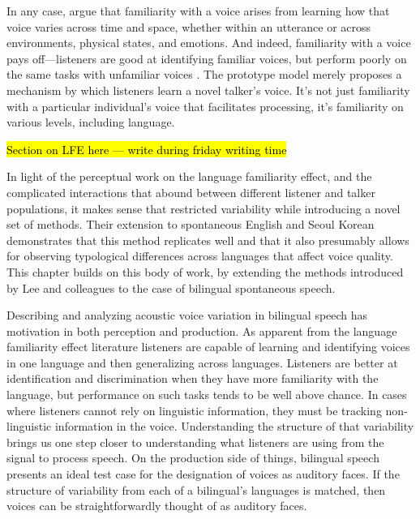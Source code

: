 In any case, \citet{lee_2019_acoustic} argue that familiarity with a voice arises from learning how that voice varies across time and space, whether within an utterance or across environments, physical states, and emotions. And indeed, familiarity with a voice pays off---listeners are good at identifying familiar voices, but perform poorly on the same tasks with unfamiliar voices \citep{nygaard_1998_talker}. The prototype model merely proposes a mechanism by which listeners learn a novel talker's voice. It's not just familiarity with a particular individual's voice that facilitates processing, it's familiarity on various levels, including language. 

\hl{Section on LFE here --- write during friday writing time}


In light of the perceptual work on the language familiarity effect, and the complicated interactions that abound between different listener and talker populations, it makes sense that \citet{lee_2019_acoustic} restricted variability while introducing a novel set of methods. Their extension to spontaneous English and Seoul Korean demonstrates that this method replicates well and that it also presumably allows for observing typological differences across languages that affect voice quality. This chapter builds on this body of work, by extending the methods introduced by Lee and colleagues to the case of bilingual spontaneous speech. 

Describing and analyzing acoustic voice variation in bilingual speech has motivation in both perception and production. As apparent from the language familiarity effect literature listeners are capable of learning and identifying voices in one language and then generalizing across languages. Listeners are better at identification and discrimination when they have more familiarity with the language, but performance on such tasks tends to be well above chance. In cases where listeners cannot rely on linguistic information, they must be tracking non-linguistic information in the voice. Understanding the structure of that variability brings us one step closer to understanding what listeners are using from the signal to process speech. On the production side of things, bilingual speech presents an ideal test case for the designation of voices as auditory faces. If the structure of variability from each of a bilingual's languages is matched, then voices can be straightforwardly thought of as auditory faces. 

